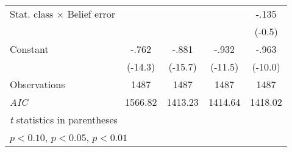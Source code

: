 \begin{table}[htbp]
\begin{tabular}{l*{4}{c}}
Stat. class $\times$ Belief error&                  &                  &                  &    -.135         \\
                &                  &                  &                  &   (-0.5)         \\
Constant        &    -.762\sym{***}&    -.881\sym{***}&    -.932\sym{***}&    -.963\sym{***}\\
                &  (-14.3)         &  (-15.7)         &  (-11.5)         &  (-10.0)         \\
\hline
Observations    &     1487         &     1487         &     1487         &     1487         \\
\textit{AIC}    &  1566.82         &  1413.23         &  1414.64         &  1418.02         \\
\hline\hline
\multicolumn{5}{l}{\footnotesize \textit{t} statistics in parentheses}\\
\multicolumn{5}{l}{\footnotesize \sym{*} \(p<0.10\), \sym{**} \(p<0.05\), \sym{***} \(p<0.01\)}\\
\end{tabular}
\end{table}
